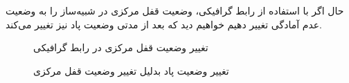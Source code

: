 {    حال اگر با استفاده از رابط گرافیکی، وضعیت قفل مرکزی در شبیه‌ساز را به وضعیت عدم آمادگی تغییر دهیم خواهیم دید که بعد از مدتی وضعیت پاد نیز تغییر می‌کند.
    \begin{figure}[H]
        \caption{تغییر وضعیت قفل مرکزی در رابط گرافیکی}
        \label{fig:dash_lock_main_change_readiness}
    \end{figure}

    \begin{figure}[H]
        \caption{تغییر وضعیت پاد بدلیل تغییر وضعیت قفل مرکزی}
        \label{fig:dash_pod_lock_main_change readiness}
    \end{figure}
}



